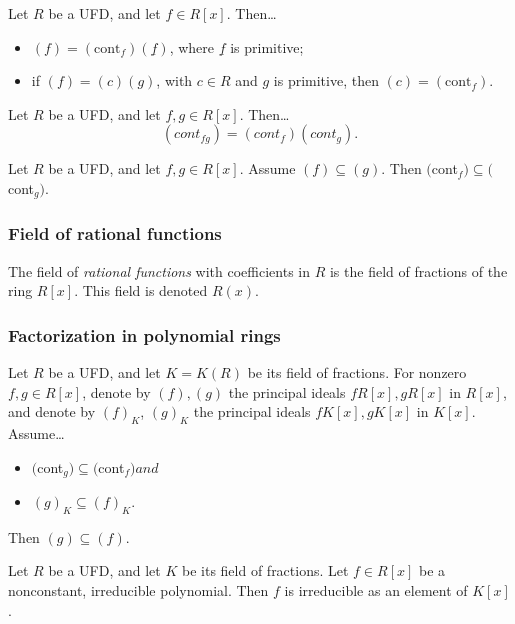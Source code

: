 \begin{lemma}
Let $R$ be a UFD, and let $f \in R[x]$. Then\dots
\begin{itemize}
  \item $(f) = (\textrm{cont}_f)(\underline{f})$, where $\underline{f}$ is primitive;
  \item if $(f) = (c)(g)$, with $c \in R$ and $g$ is primitive, then $(c) = (\textrm{cont}_f)$.
\end{itemize}
\end{lemma}

\begin{proposition}
\label{gausslemma}
Let $R$ be a UFD, and let $f,g \in R[x]$. Then\dots
$$(cont_{fg}) = (cont_f)(cont_g).$$
\end{proposition}

\begin{corollary}
Let $R$ be a UFD, and let $f,g \in R[x]$. Assume $(f) \subseteq (g)$. Then $($cont$_f) \subseteq ($cont$_g)$.
\end{corollary}

\subsubsection{Field of rational functions}\label{fieldofrationalfunctions}
The field of \emph{rational functions} with coefficients in $R$ is the field of fractions of the ring $R[x]$. This field is denoted $R(x)$.

\subsubsection{Factorization in polynomial rings}

\begin{lemma}
Let $R$ be a UFD, and let $K = K(R)$ be its field of fractions. For nonzero $f,g \in R[x]$, denote by $(f), (g)$ the principal ideals $fR[x], gR[x]$ in $R[x]$,
and denote by $(f)_K$, $(g)_K$ the principal ideals $fK[x], gK[x]$ in $K[x]$. Assume\dots
\begin{itemize}
  \item $($cont$_g) \subseteq ($cont$_f) and$
  \item $(g)_K \subseteq (f)_K$.
\end{itemize}
Then $(g) \subseteq (f)$.
\end{lemma}

\begin{proposition}
Let $R$ be a UFD, and let $K$ be its field of fractions. Let $f \in R[x]$ be a nonconstant, irreducible polynomial. Then $f$ is irreducible as
an element of $K[x]$.
\end{proposition}

